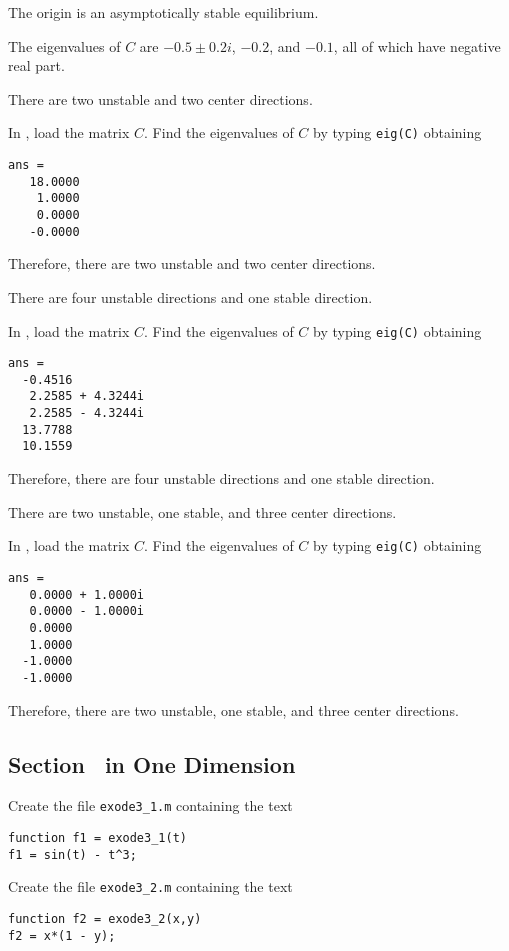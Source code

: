 \documentclass{ximera}
\begin{document}
\ans The origin is an asymptotically stable equilibrium.

\soln The eigenvalues of $C$ are $-0.5 \pm 0.2i$, $-0.2$, and $-0.1$, all
of which have negative real part.


 \ans There are two unstable and two center directions.

\soln In \Matlabp, load the matrix $C$.  Find the eigenvalues of $C$ by
typing {\tt eig(C)} obtaining
\begin{verbatim}
ans =
   18.0000
    1.0000
    0.0000
   -0.0000
\end{verbatim}
Therefore, there are two unstable and two center directions.

 \ans There are four unstable directions and one stable 
direction.

\soln In \Matlabp, load the matrix $C$.  Find the eigenvalues of $C$ by
typing {\tt eig(C)} obtaining
\begin{verbatim}
ans =
  -0.4516          
   2.2585 + 4.3244i
   2.2585 - 4.3244i
  13.7788          
  10.1559   
\end{verbatim}
Therefore, there are four unstable directions and one stable direction.


 \ans There are two unstable, one stable, and three center 
directions.


\soln In \Matlabp, load the matrix $C$.  Find the eigenvalues of $C$ by
typing {\tt eig(C)} obtaining
\begin{verbatim}
ans =
   0.0000 + 1.0000i
   0.0000 - 1.0000i
   0.0000          
   1.0000          
  -1.0000          
  -1.0000  
\end{verbatim}
Therefore, there are two unstable, one stable, and three center directions.




\subsection*{Section~\protect{\ref{S:ode45}}  in One Dimension}

Create the file {\tt exode3\_1.m} containing the text
\begin{verbatim}
function f1 = exode3_1(t)
f1 = sin(t) - t^3;
\end{verbatim}

Create the file {\tt exode3\_2.m} containing the text
\begin{verbatim}
function f2 = exode3_2(x,y)
f2 = x*(1 - y);
\end{verbatim}
\end{document}
